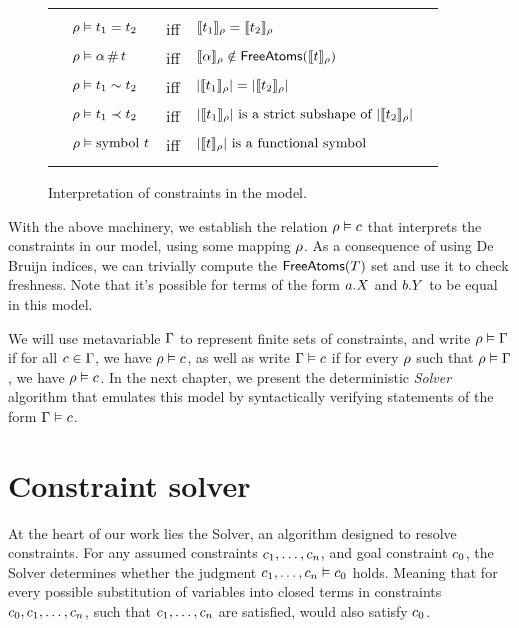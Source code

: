 \documentclass[english, mgr]{iithesis}
\renewcommand{\it}[1]{\textit{#1}}
\begin{document}
\begin{figure}[htbp]
  \centering
    \begin{tabularx}{\textwidth}{|XlclX|}
      \hline & & & & \\
      & $\rho \vDash t_1 = t_2 $  & \textrm{iff} &
        $\llbracket t_1 \rrbracket_{\rho} = \llbracket t_2 \rrbracket_{\rho}$ & \\
      & $\rho \vDash \alpha \,\#\, t$ & \textrm{iff} &
        $\llbracket \alpha \rrbracket_{\rho} \notin
          \mathsf{FreeAtoms}(\llbracket t \rrbracket_{\rho})$ & \\
      & $\rho \vDash t_1 \sim t_2$ & \textrm{iff} &
        $|\llbracket t_1 \rrbracket_{\rho}| = |\llbracket t_2 \rrbracket_{\rho}|$ & \\
      & $\rho \vDash t_1 \prec t_2$ & \textrm{iff} &
        $|\llbracket t_1 \rrbracket_{\rho}| \textrm{ is a strict subshape of }
          |\llbracket t_2 \rrbracket_{\rho}|$ & \\
      & $\rho \vDash \text{symbol } t$ & \textrm{iff} &
        $|\llbracket t \rrbracket_{\rho}| \textrm{ is a functional symbol }$ & \\
      & & & & \\ \hline
    \end{tabularx}
  \caption{Interpretation of constraints in the model.}
  \label{fig:constraint-interpretation}
\end{figure}
With the above machinery, we establish the relation $\rho \vDash c$
that interprets the constraints in our model, using some mapping $\rho$.
As a consequence of using De Bruijn indices, we can trivially compute the
$\mathsf{FreeAtoms}(T)$ set and use it to check freshness.
Note that it's possible for terms of the form $a.{X}$ and $b.{Y}$
to be equal in this model.

\pagebreak

We will use metavariable $\Gamma$ to represent finite sets of constraints,
and write $\rho \vDash \Gamma$ if for all $c \in \Gamma$,
we have $\rho \vDash c$,
as well as write $\Gamma \vDash c$ if for every $\rho$ such that $\rho \vDash \Gamma$,
we have $\rho \vDash c$.
In the next chapter, we present the deterministic \it{Solver} algorithm
that emulates this model by syntactically verifying statements of the form $\Gamma \vDash c$.

\chapter{Constraint solver} \label{sec:solver}
At the heart of our work lies the Solver, an algorithm designed to resolve constraints.
For any assumed constraints $c_1, \dots, c_n$, and
goal constraint $c_0$, the Solver determines whether the judgment $c_1, \dots, c_n \vDash c_0$ holds.
Meaning that for every possible substitution of variables into closed terms in constraints $c_0, c_1, \dots, c_n$,
such that $c_1, \dots, c_n$ are satisfied, would also satisfy $c_0$.
\end{document}
